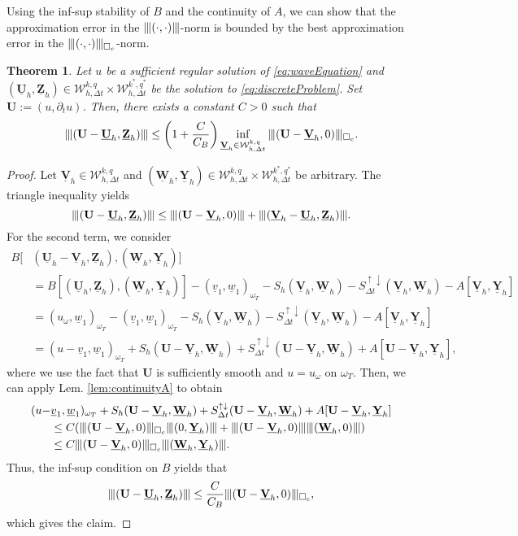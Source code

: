 \documentclass[sn-mathphys-num]{sn-jnl}
\newtheorem{thm}{Theorem}[section]
\numberwithin{equation}{section}
\newcommand{\wop}{\square_c}
\newcommand{\tnorm}[1]{\vert\hspace{-0.3mm}\Vert#1\Vert\hspace{-0.3mm}\vert}
\newcommand{\ProdFullyDiscrSpace}[2]{ \mathcal{W}^{ {#1},{#2}}_{h, \Delta t  } }
\newcommand{\Uh}{\underline{\mathbf{U}}_h}
\newcommand{\Vh}{\underline{\mathbf{V}}_h}
\newcommand{\Yh}{\underline{\mathbf{Y}}_h}
\newcommand{\Zh}{\underline{\mathbf{Z}}_h}
\newcommand{\Wh}{\underline{\mathbf{W}}_h}
\newcommand{\Sud}{S^{\uparrow \downarrow}_{\Delta t}}
\begin{document}
\noindent Using the inf-sup stability of $B$ and the continuity of $A$, we can show that the approximation error in the $\tnorm{(\cdot,\cdot)}$-norm is bounded by the best approximation error in the $\tnorm{(\cdot,\cdot)}_{\wop}$-norm.

\begin{thm}\label{thm:bestapprox}
    Let $u$ be a sufficient regular solution of \eqref{eq:waveEquation} and $(\Uh,\Zh) \in \ProdFullyDiscrSpace{k}{q} \times \ProdFullyDiscrSpace{k^\ast}{q^\ast}$ be the solution to \eqref{eq:discreteProblem}. Set $\mathbf{U} := (u,\partial_t u)$. Then, there exists a constant $C>0$ such that
    \begin{equation}
   \tnorm{(\mathbf{U} - \Uh,\Zh)} \le \left( 1 + \frac{C}{C_B} \right) \inf_{\Vh \in \ProdFullyDiscrSpace{k}{q}} \tnorm{(\mathbf{U} - \Vh, 0)}_{\wop}.  
    \end{equation}
\end{thm}

\begin{proof}
    Let $\Vh \in \ProdFullyDiscrSpace{k}{q}$  and $(\Wh,\Yh) \in \ProdFullyDiscrSpace{k}{q} \times \ProdFullyDiscrSpace{k^\ast}{q^\ast}$ be arbitrary. The triangle inequality yields 
    \begin{equation*}
        \tnorm{(\mathbf{U} - \Uh,\Zh)} \le \tnorm{(\mathbf{U} - \Vh,0)} + \tnorm{(\Vh - \Uh,\Zh)}.
    \end{equation*}
    For the second term, we consider
    \begin{align*}
        B[&(\Uh - \Vh, \Zh),( \Wh, \Yh)] \\
        &= B[(\Uh,\Zh),( \Wh, \Yh)] - (\underline{v}_1, \underline{w}_1)_{\omega_T} - S_h(\Vh,\Wh) - \Sud(\Vh,\Wh) - A[\Vh,\Yh] \\
        &= (u_{\omega}, \underline{w}_1)_{\omega_T} - (\underline{v}_1, \underline{w}_1)_{\omega_T} - S_h(\Vh,\Wh) - \Sud(\Vh,\Wh) - A[\Vh,\Yh] \\
        &= (u - \underline{v}_1, \underline{w}_1)_{\omega_T}  +  S_h(\mathbf{U} - \Vh,\Wh) + \Sud(\mathbf{U} - \Vh,\Wh) + A[\mathbf{U} - \Vh,\Yh],
    \end{align*} 
    where we use the fact that $\mathbf{U}$ is sufficiently smooth and $u = u_{\omega}$ on $\omega_T$. Then, we can apply Lem. \ref{lem:continuityA} to obtain 
    \begin{align*}
        (u - &\underline{v}_1, \underline{w}_1)_{\omega_T}  +  S_h(\mathbf{U} - \Vh,\Wh) + \Sud(\mathbf{U} - \Vh,\Wh) + A[\mathbf{U} - \Vh,\Yh] \\
        &\le C(\tnorm{(\mathbf{U} - \Vh,0)}_{\wop} \tnorm{(0,\Yh)}  + \tnorm{(\mathbf{U} - \Vh,0)} \tnorm{(\Wh,0)} ) \\
        &\le C \tnorm{(\mathbf{U} - \Vh,0)}_{\wop} \tnorm{(\Wh,\Yh)}.
    \end{align*}
    Thus, the inf-sup condition on $B$ yields that 
    \begin{equation*}
    \tnorm{(\mathbf{U} - \Uh,\Zh)} \le \frac{C}{C_B} \tnorm{(\mathbf{U} - \Vh, 0)}_{\wop},
    \end{equation*}
    which gives the claim. 
\end{proof}
\end{document}
